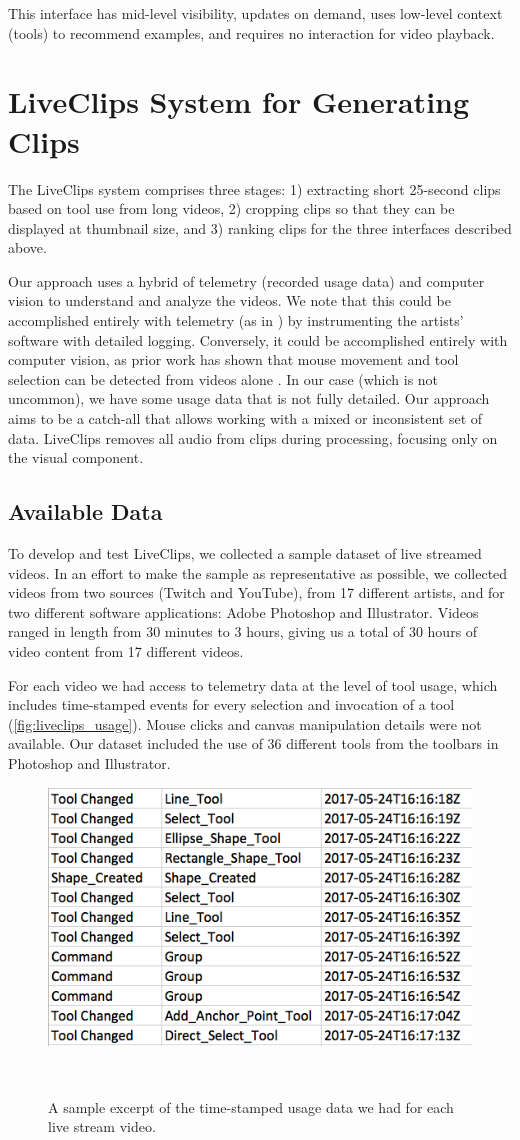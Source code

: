 This interface has mid-level visibility, updates on demand, uses low-level context (tools) to recommend examples, and requires no interaction for video playback. 

\section{LiveClips System for Generating Clips}
The LiveClips system comprises three stages: 1) extracting short 25-second clips based on tool use from long videos, 2) cropping clips so that they can be displayed at thumbnail size, and 3) ranking clips for the three interfaces described above. 

Our approach uses a hybrid of telemetry (recorded usage data) and computer vision to understand and analyze the videos. We note that this could be accomplished entirely with telemetry (as in \cite{Grossman2010, Lafreniere2014}) by instrumenting the artists' software with detailed logging. Conversely, it could be accomplished entirely with computer vision, as prior work has shown that mouse movement and tool selection can be detected from videos alone \cite{Banovic2012, Pongnumkul2011}. In our case (which is not uncommon), we have some usage data that is not fully detailed. Our approach aims to be a catch-all that allows working with a mixed or inconsistent set of data. LiveClips removes all audio from clips during processing, focusing only on the visual component.

\subsection{Available Data}
To develop and test LiveClips, we collected a sample dataset of live streamed videos. In an effort to make the sample as representative as possible, we collected videos from two sources (Twitch and YouTube), from 17 different artists, and for two different software applications: Adobe Photoshop and Illustrator. Videos ranged in length from 30 minutes to 3 hours, giving us a total of 30 hours of video content from 17 different videos. 

For each video we had access to telemetry data at the level of tool usage, which includes time-stamped events for every selection and invocation of a tool (\autoref{fig:liveclips_usage}). Mouse clicks and canvas manipulation details were not available. Our dataset included the use of 36 different tools from the toolbars in Photoshop and Illustrator.  

\begin{figure}[b!]
\centering
  \includegraphics[width=0.5\columnwidth]{liveclips/figures/usage.png}
  \caption{A sample excerpt of the time-stamped usage data we had for each live stream video.}~\label{fig:liveclips_usage}
\end{figure}



